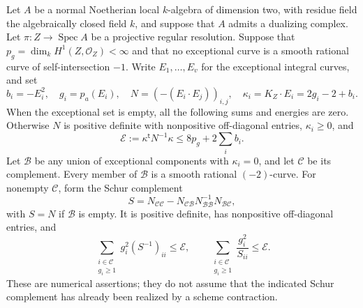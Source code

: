 \begin{proposition}
\label{D:exceptional-canonical-energy}
Let $A$ be a normal Noetherian local $k$-algebra of dimension two,
with residue field the algebraically closed field $k$, and suppose that
$A$ admits a dualizing complex. Let
$\pi:Z\to\operatorname{Spec}A$ be a projective regular resolution. Suppose
that $p_g=\dim_kH^1(Z,\mathcal O_Z)<\infty$ and that no exceptional
curve is a smooth rational curve of self-intersection $-1$.
Write $E_1,\ldots,E_v$ for the exceptional integral curves, and set
\[
 b_i=-E_i^2,\quad g_i=p_a(E_i),\quad
 N=(-(E_i\cdot E_j))_{i,j},\quad
 \kappa_i=K_Z\cdot E_i=2g_i-2+b_i.
\]
When the exceptional set is empty, all the following sums and energies
are zero. Otherwise $N$ is positive definite with nonpositive
off-diagonal entries, $\kappa_i\ge0$, and
\[
 \mathcal E:=\kappa^{\mathsf t}N^{-1}\kappa
       \le 8p_g+2\sum_i b_i.                           \tag{D.CE.1}
\]
Let $\mathcal B$ be any union of exceptional components with
$\kappa_i=0$, and let $\mathcal C$ be its complement. Every member of
$\mathcal B$ is a smooth rational $(-2)$-curve. For nonempty
$\mathcal C$, form the Schur complement
\[
 S=N_{\mathcal C\mathcal C}
       -N_{\mathcal C\mathcal B}
        N_{\mathcal B\mathcal B}^{-1}N_{\mathcal B\mathcal C},
                                                               \tag{D.CE.2}
\]
with $S=N$ if $\mathcal B$ is empty. It is positive definite, has
nonpositive off-diagonal entries, and
\[
 \sum_{\substack{i\in\mathcal C\\g_i\ge1}}
       g_i^2(S^{-1})_{ii}
 \le \mathcal E,
 \qquad
 \sum_{\substack{i\in\mathcal C\\g_i\ge1}}
       \frac{g_i^2}{S_{ii}}
 \le \mathcal E.                                      \tag{D.CE.3}
\]
These are numerical assertions; they do not assume that the indicated
Schur complement has already been realized by a scheme contraction.
\end{proposition}
